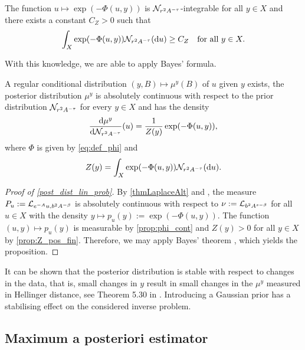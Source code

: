 \documentclass[english]{jnsao}
\theoremstyle{definition}
\begin{document}
\begin{proposition}
	\label{prop:Z_pos_fin}
	The function $u \mapsto \exp(-\Phi(u,y))$ is $\mathcal{N}_{r^2 A^{-\tau}}$-integrable for all $y \in X$ and there exists a constant $C_Z > 0$ such that
	\begin{equation*}
		\int_X \exp(-\Phi(u,y)) \mathcal{N}_{r^2 A^{-\tau}}(\mathrm{d} u) \ge C_Z \quad \text{for all }y \in X.
	\end{equation*}
\end{proposition}
With this knowledge, we are able to apply Bayes' formula.
\begin{theorem}
	\label{post_dist_lin_prob}
	A regular conditional distribution $(y,B) \mapsto \mu^y(B)$ of $u$ given $y$ exists, the posterior distribution $\mu^y$ is absolutely continuous with respect to the prior distribution $\mathcal{N}_{r^2 A^{-\tau}}$ for every $y \in X$ and has the density
	\begin{equation} 
		\label{eq:post_dens}
		\frac{\mathrm{d}\mu^y}{\mathrm{d}\mathcal{N}_{r^2 A^{-\tau}}}(u)
		= \frac{1}{Z(y)} \exp(-\Phi(u,y)),
	\end{equation}
	where $\Phi$ is given by \eqref{eq:def_phi} and
	\begin{equation*}
		Z(y) = \int_X \exp(-\Phi(u,y)) \mathcal{N}_{r^2 A^{-\tau}}(\mathrm{d} u).
	\end{equation*}
\end{theorem}
\begin{proof}[Proof of \cref{post_dist_lin_prob}]
	By \cref{thmLaplaceAlt} and \cite[Lem.~5.15]{Kretschmann:2019}, the measure $P_{u} := \mathcal{L}_{e^{-A}u, b^2 A^{-\beta}}$ is absolutely continuous with respect to $\nu := \mathcal{L}_{b^2 A^{s-\beta}}$ for all $u \in X$ with the density $y \mapsto p_{u}(y) := \exp(-\Phi(u,y))$. 
	The function $(u,y) \mapsto p_u(y)$ is measurable by \cref{prop:phi_cont} and $Z(y) > 0$ for all $y \in X$ by \cref{prop:Z_pos_fin}.
	Therefore, we may apply Bayes' theorem \cite[Thm.~1.3]{Kretschmann:2019}, which yields the proposition.
\end{proof}

It can be shown that the posterior distribution is stable with respect to changes in the data, that is, small changes in $y$ result in small changes in the $\mu^y$ measured in Hellinger distance, see Theorem 5.30 in \cite{Kretschmann:2019}. Introducing a Gaussian prior has a stabilising effect on the considered inverse problem.

\subsection{Maximum a posteriori estimator}
\end{document}

